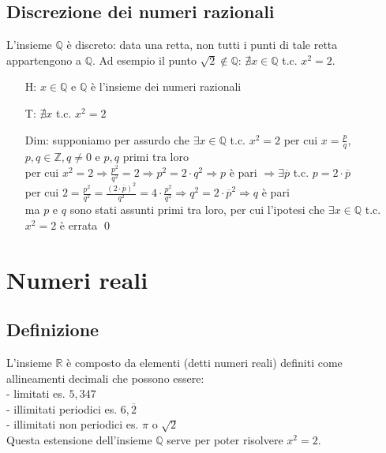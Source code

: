 \documentclass[a4paper]{article}
\begin{document}
\subsection{Discrezione dei numeri razionali}
L'insieme \(\mathbb{Q}\) è discreto: data una retta, non tutti i punti di tale retta appartengono a \(\mathbb{Q}\).
Ad esempio il punto \(\sqrt{2} \notin \mathbb{Q}\): \(\nexists x \in \mathbb{Q}\) t.c. \(x^2 = 2\).
\begin{itemize}
	\item[H: ] \(x \in \mathbb{Q}\) e \(\mathbb{Q}\) è l'insieme dei numeri razionali
	\item[T: ] \(\nexists x\) t.c. \(x^2 = 2\)
	\item[Dim: ] supponiamo per assurdo che \(\exists x \in \mathbb{Q}\) t.c. \(x^2 = 2\) per cui \(x = \displaystyle \frac{p}{q}\), \(p,q \in \mathbb{Z}, q \neq 0\) e \(p,q\) primi tra loro \\
	per cui \(x^2 = 2 \Rightarrow \displaystyle \frac{p^2}{q^2} = 2 \Rightarrow p^2 = 2 \cdot q^2 \Rightarrow p\) è pari \(\Rightarrow \exists \overline{p}\) t.c. \(p = 2 \cdot \overline{p}\) \\
	per cui \(2 = \displaystyle \frac{p^2}{q^2} = \frac{(2 \cdot \overline{p})^2}{q^2} = 4 \cdot \frac{p^2}{q^2} \Rightarrow q^2 = 2 \cdot \overline{p}^2 \Rightarrow q\) è pari \\
	ma \(p\) e \(q\) sono stati assunti primi tra loro, per cui l'ipotesi che \(\exists x \in \mathbb{Q}\) t.c. \(x^2 = 2\) è errata \qed
\end{itemize}

\newpage

\section{Numeri reali}
\subsection{Definizione}
L'insieme \(\mathbb{R}\) è composto da elementi (detti numeri reali) definiti come allineamenti decimali che possono essere: \\
- limitati es. \(5,347\) \\
- illimitati periodici es. \(6,\overline{2}\) \\
- illimitati non periodici es. \(\pi\) o \(\sqrt{2}\) \\
Questa estensione dell'insieme \(\mathbb{Q}\) serve per poter risolvere \(x^2 = 2\).
\end{document}

